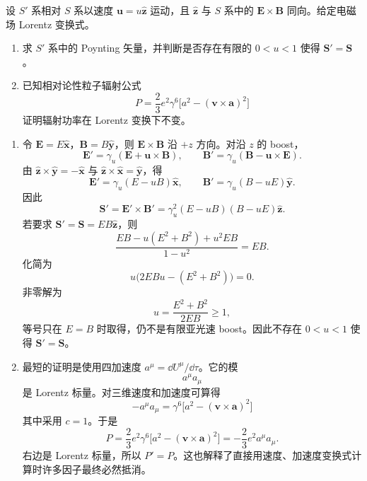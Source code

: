\begin{question}
设 $S'$ 系相对 $S$ 系以速度 $\mathbf u=u\hat{\mathbf z}$ 运动，且 $\hat{\mathbf z}$ 与 $S$ 系中的 $\mathbf E\times\mathbf B$ 同向。给定电磁场 Lorentz 变换式。
\begin{enumerate}
  \item 求 $S'$ 系中的 Poynting 矢量，并判断是否存在有限的 $0<u<1$ 使得 $\mathbf S'=\mathbf S$。
  \item 已知相对论性粒子辐射公式
  \[
    P=\frac23e^2\gamma^6\bigl[a^2-(\mathbf v\times\mathbf a)^2\bigr]
  \]
  证明辐射功率在 Lorentz 变换下不变。
\end{enumerate}
\begin{solution}
\begin{enumerate}
  \item 令 $\mathbf E=E\hat{\mathbf x}$，$\mathbf B=B\hat{\mathbf y}$，则 $\mathbf E\times\mathbf B$ 沿 $+z$ 方向。对沿 $z$ 的 boost，
  \[
    \mathbf E'=\gamma_u(\mathbf E+\mathbf u\times\mathbf B),
    \qquad
    \mathbf B'=\gamma_u(\mathbf B-\mathbf u\times\mathbf E) .
  \]
  由 $\hat{\mathbf z}\times\hat{\mathbf y}=-\hat{\mathbf x}$ 与 $\hat{\mathbf z}\times\hat{\mathbf x}=\hat{\mathbf y}$，得
  \[
    \mathbf E'=\gamma_u(E-uB)\hat{\mathbf x},
    \qquad
    \mathbf B'=\gamma_u(B-uE)\hat{\mathbf y} .
  \]
  因此
  \[
    \boxed{\mathbf S'=\mathbf E'\times\mathbf B'
    =\gamma_u^2(E-uB)(B-uE)\hat{\mathbf z}} .
  \]
  若要求 $\mathbf S'=\mathbf S=EB\hat{\mathbf z}$，则
  \[
    \frac{EB-u(E^2+B^2)+u^2EB}{1-u^2}=EB .
  \]
  化简为
  \[
    u\bigl(2EBu-(E^2+B^2)\bigr)=0 .
  \]
  非零解为
  \[
    u=\frac{E^2+B^2}{2EB}\geq1,
  \]
  等号只在 $E=B$ 时取得，仍不是有限亚光速 boost。因此不存在 $0<u<1$ 使得 $\mathbf S'=\mathbf S$。

  \item 最短的证明是使用四加速度 $a^\mu=\dd{U^\mu}/\dd{\tau}$。它的模
  \[
    a^\mu a_\mu
  \]
  是 Lorentz 标量。对三维速度和加速度可算得
  \[
    -a^\mu a_\mu=\gamma^6\bigl[a^2-(\mathbf v\times\mathbf a)^2\bigr]
  \]
  其中采用 $c=1$。于是
  \[
    P=\frac23e^2\gamma^6\bigl[a^2-(\mathbf v\times\mathbf a)^2\bigr]
    =-\frac23e^2a^\mu a_\mu .
  \]
  右边是 Lorentz 标量，所以 $P'=P$。这也解释了直接用速度、加速度变换式计算时许多因子最终必然抵消。
\end{enumerate}
\end{solution}
\end{question}

